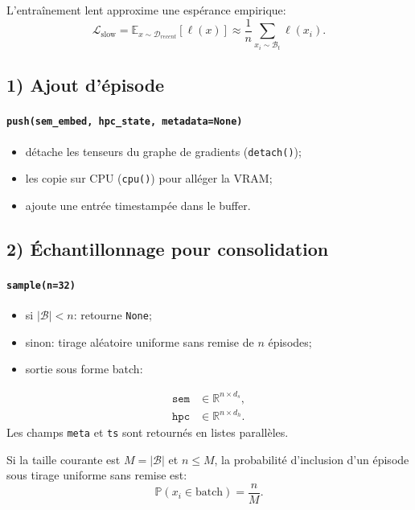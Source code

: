 \documentclass[12pt,a4paper]{article}
\begin{document}
L'entraînement lent approxime une espérance empirique:
\begin{equation}
\mathcal{L}_{\text{slow}}
= \mathbb{E}_{x\sim \mathcal{D}_{recent}}[\ell(x)]
\approx \frac{1}{n}\sum_{x_i \sim \mathcal{B}_t}\ell(x_i).
\end{equation}

\subsection{1) Ajout d'épisode}
\paragraph{\texttt{push(sem\_embed, hpc\_state, metadata=None)}}
\begin{itemize}[leftmargin=*]
    \item détache les tenseurs du graphe de gradients (\texttt{detach()});
    \item les copie sur CPU (\texttt{cpu()}) pour alléger la VRAM;
    \item ajoute une entrée timestampée dans le buffer.
\end{itemize}

\subsection{2) Échantillonnage pour consolidation}
\paragraph{\texttt{sample(n=32)}}
\begin{itemize}[leftmargin=*]
    \item si $|\mathcal{B}| < n$: retourne \texttt{None};
    \item sinon: tirage aléatoire uniforme sans remise de $n$ épisodes;
    \item sortie sous forme batch:
\end{itemize}
\begin{align}
\texttt{sem} &\in \mathbb{R}^{n \times d_s},\\
\texttt{hpc} &\in \mathbb{R}^{n \times d_h}.
\end{align}
Les champs \texttt{meta} et \texttt{ts} sont retournés en listes parallèles.

Si la taille courante est $M=|\mathcal{B}|$ et $n\le M$, la probabilité d'inclusion d'un épisode sous tirage uniforme sans remise est:
\begin{equation}
\mathbb{P}(x_i \in \text{batch}) = \frac{n}{M}.
\end{equation}
\end{document}
